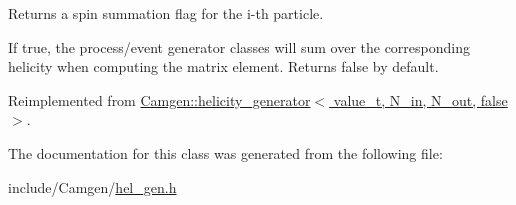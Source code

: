 Returns a spin summation flag for the i-\/th particle. 

If true, the process/event generator classes will sum over the corresponding helicity when computing the matrix element. Returns false by default. 

Reimplemented from \hyperlink{a00271_ab8d236622fd171df60d0b733d1ae1720}{Camgen\+::helicity\+\_\+generator$<$ value\+\_\+t, N\+\_\+in, N\+\_\+out, false $>$}.



The documentation for this class was generated from the following file\+:\begin{DoxyCompactItemize}
\item 
include/\+Camgen/\hyperlink{a00659}{hel\+\_\+gen.\+h}\end{DoxyCompactItemize}
